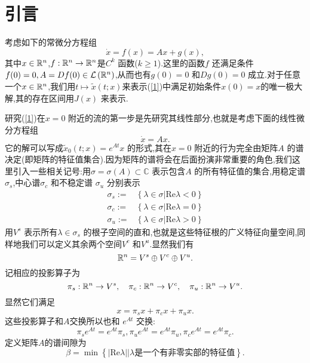 \section{引言}
考虑如下的常微分方程组
\begin{equation}
  \dot{x}=f(x)=Ax+g(x),\label{1}
\end{equation}
其中$x\in \mathbb{R}^{n}$,$f:\mathbb{R}^{n}\to \mathbb{R}^{n}$是$C^{k}$ 函数($k\ge 1$).这里的函数$f$ 还满足条件$f(0)=0,A=Df(0)\in \mathcal{L}\left( \mathbb{R}^{n} \right) $,从而也有$g(0)=0$ 和$Dg(0)=0$ 成立.对于任意一个$x\in \mathbb{R}^{n}$,我们用$t\mapsto \tilde{x}(t;x)$来表示(\ref{1})中满足初始条件$x(0)=x$的唯一极大解,其的存在区间用$J(x)$ 来表示.

研究(\ref{1})在$x=0$ 附近的流的第一步是先研究其线性部分,也就是考虑下面的线性微分方程组
\begin{equation}
  \dot{x}=Ax.\label{2}
\end{equation}
它的解可以写成$\tilde{x}_0(t;x)=e^{At}x$ 的形式,其在$x=0$ 附近的行为完全由矩阵$A$ 的谱决定(即矩阵的特征值集合).因为矩阵的谱将会在后面扮演非常重要的角色,我们这里引入一些相关记号:用$\sigma =\sigma(A)\subset \mathbb{C}$ 表示包含$A$ 的所有特征值的集合,用稳定谱$\sigma_s$,中心谱$\sigma_c$ 和不稳定谱 $\sigma_u$ 分别表示
\begin{equation}
  \begin{aligned}
    \sigma_s:= & \left\{ \lambda \in \sigma\lvert \text{Re}\lambda<0 \right\} \\
    \sigma_c:= & \left\{ \lambda \in \sigma\lvert \text{Re}\lambda=0 \right\} \\
    \sigma_u:= & \left\{ \lambda \in \sigma\lvert \text{Re}\lambda>0 \right\} 
  \end{aligned}
\end{equation}
用$V^{s}$ 表示所有$\lambda \in \sigma_s$ 的根子空间的直和,也就是这些特征根的广义特征向量空间,同样地我们可以定义其余两个空间$V^{c}$ 和$V^{u}$.显然我们有
 \begin{equation}
  \mathbb{R}^{n}=V^{s}\oplus V^{c}\oplus V^{u}.
\end{equation}
记相应的投影算子为
\[
\pi_s:\mathbb{R}^{n}\to V^{s},\quad \pi_c:\mathbb{R}^{n}\to V^{c},\quad \pi_u:\mathbb{R}^{n}\to V^{u}.
\] 
显然它们满足
\[
x=\pi_sx+\pi_cx+\pi_ux.
\] 
这些投影算子和$A$交换所以也和 $e^{At}$ 交换:
\begin{equation}
  \pi_s e^{At}=e^{At}\pi_s, \pi_u e^{At}=e^{At}\pi_u, \pi_c e^{At}=e^{At}\pi_c.\label{comm}
\end{equation}
定义矩阵$A$的谱间隙为
\begin{equation}
  \beta=\min\left\{ \left| \text{Re}\lambda \right| \lvert \lambda \text{是一个有非零实部的特征值} \right\}. \label{gap}
\end{equation}
